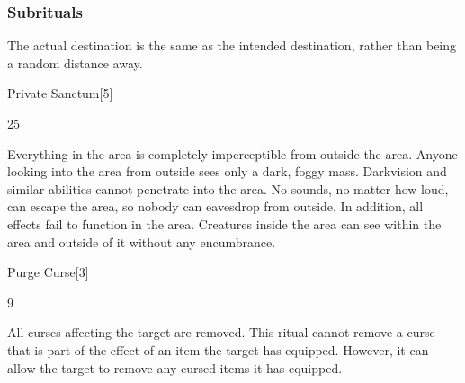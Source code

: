 \subsubsection{Subrituals}
The actual destination is the same as the intended destination, rather than being a random distance away.
\begin{spellsection}{Private Sanctum}[5]
\begin{spellcontent}
\begin{spelltargetinginfo}
 25
\end{spelltargetinginfo}
\begin{spelleffects}
\spelleffect
Everything in the area is completely imperceptible from outside the area.
Anyone looking into the area from outside sees only a dark, foggy mass.
Darkvision and similar abilities cannot penetrate into the area.
No sounds, no matter how loud, can escape the area, so nobody can eavesdrop from outside.
In addition, all  effects fail to function in the area.
Creatures inside the area can see within the area and outside of it without any encumbrance.
\end{spelleffects}
\end{spellcontent}
\begin{spellfooter}
\end{spellfooter}
\begin{spellsubcontent}
\end{spellsubcontent}
\end{spellsection}
\begin{spellsection}{Purge Curse}[3]
\begin{spellcontent}
\begin{spelltargetinginfo}
 9
\end{spelltargetinginfo}
\begin{spelleffects}
\spelleffect
All curses affecting the target are removed.
This ritual cannot remove a curse that is part of the effect of an item the target has equipped.
However, it can allow the target to remove any cursed items it has equipped.
\end{spelleffects}
\end{spellcontent}
\begin{spellfooter}
\end{spellfooter}
\begin{spellsubcontent}
\end{spellsubcontent}
\end{spellsection}
